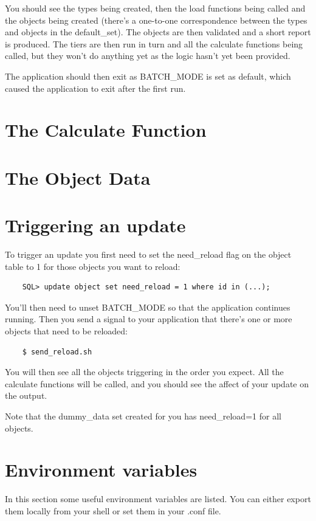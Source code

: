 \documentclass{report}
\begin{document}
You should see the types being created, then the load functions being called and the objects being created (there's a one-to-one correspondence between the types and objects in the default_set). The objects are then validated and a short report is produced. The tiers are then run in turn and all the calculate functions being called, but they won't do anything yet as the logic hasn't yet been provided.

The application should then exit as BATCH_MODE is set as default, which caused the application to exit after the first run.

\section{The Calculate Function}

\section{The Object Data}

\section{Triggering an update}

To trigger an update you first need to set the need_reload flag on the object table to 1 for those objects you want to reload:

\begin{verbatim}
    SQL> update object set need_reload = 1 where id in (...);
\end{verbatim}

You'll then need to unset BATCH_MODE so that the application continues running. Then you send a signal to your application that there's one or more objects that need to be reloaded:

\begin{verbatim}
    $ send_reload.sh 
\end{verbatim}

You will then see all the objects triggering in the order you expect. All the calculate functions will be called, and you should see the affect of your update on the output.

Note that the dummy_data set created for you has need_reload=1 for all objects.

\section{Environment variables}
In this section some useful environment variables are listed. You can either export them locally from your shell or set them in your .conf file.
\end{document}
